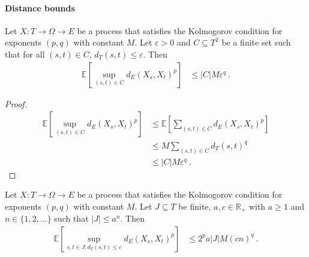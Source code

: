 \paragraph{Distance bounds}

\begin{lemma}\label{lem:integral_sup_rpow_dist_le_card_mul_rpow}
  \leanok
Let $X : T \to \Omega \to E$ be a process that satisfies the Kolmogorov condition for exponents $(p,q)$ with constant $M$.
Let $\varepsilon > 0$ and $C \subseteq T^2$ be a finite set such that for all $(s, t) \in C$, $d_T(s, t) \le \varepsilon$.
Then
\begin{align*}
  \mathbb{E}\left[\sup_{(s,t) \in C} d_E(X_s, X_t)^p \right]
  &\le \vert C \vert M \varepsilon^q
  \: .
\end{align*}
\end{lemma}

\begin{proof}\leanok
\begin{align*}
  \mathbb{E}\left[\sup_{(s,t) \in C} d_E(X_s, X_t)^p \right]
  &\le \mathbb{E}\left[\sum_{(s,t) \in C} d_E(X_s, X_t)^p \right]
  \\
  &\le M \sum_{(s,t) \in C} d_T(s, t)^q
  \\
  &\le \vert C \vert M \varepsilon^q
  \: .
\end{align*}
\end{proof}


\begin{lemma}\label{lem:integral_sup_rpow_dist_of_dist_le}
  \leanok
Let $X : T \to \Omega \to E$ be a process that satisfies the Kolmogorov condition for exponents $(p,q)$ with constant $M$.
Let $J \subseteq T$ be finite, $a, c \in \mathbb R_+$ with $a \ge 1$ and $n \in \{1, 2, ...\}$ such that $|J| \le a^n$.
Then
\begin{align*}
  \mathbb{E} \left[ \sup_{s, t \in J; d_T(s, t) \le c} d_E(X_s, X_t)^p \right]
  &\le 2^p a |J| M (cn)^q
  \: .
\end{align*}
\end{lemma}

